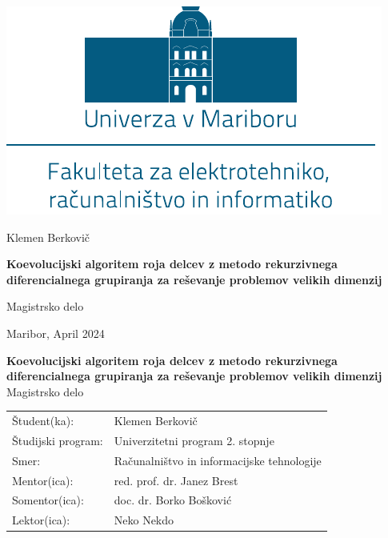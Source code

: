 \documentclass[openany, a4paper, 12pt]{book}
\newcounter{footnotemarknum}
\newcommand{\footnotemarkenv}{\addtocounter{footnotemarknum}{1}\footnotemark}
\newcommand{\aauthor}{Klemen Berkovi\v{c}}
\newcommand{\atitleslo}{Koevolucijski algoritem roja delcev z metodo rekurzivnega diferencialnega grupiranja za reševanje problemov velikih dimenzij}
\newcommand{\atype}{Magistrsko delo}
\newcommand{\adate}{Maribor, April 2024}
\newcommand{\amentor}{red. prof. dr. Janez Brest}
\newcommand{\asomentor}{doc. dr. Borko Bošković}
\newcommand{\alektor}{Neko Nekdo}
\begin{document}
\newpage
\begin{center}
\includegraphics[scale=0.9]{img/logo-um-feri.pdf} %
\vspace{3cm}

{\LARGE \aauthor\\} %
\vspace{10mm}

{\bf \huge \MakeUppercase \atitleslo}\\ %
\vspace{10mm}

{\LARGE \atype}\\ %
\vspace{8.5cm}

{\LARGE \adate}\\ %
\end{center}

\newpage
\pagestyle{frontpage}

\vspace*{7.5cm}
\begin{center}
{\bf \LARGE \MakeUppercase \atitleslo}\\ %
\vspace{5mm}
{\Large \atype}\\ %
\end{center}
\vspace{6cm}
\begin{table}[h]
    \renewcommand{\arraystretch}{1.5}
    \begin{tabular}{ll}
     Študent(ka): & \aauthor \\
     Študijski program: & Univerzitetni program 2. stopnje \\
     Smer: & Računalništvo in informacijske tehnologije \\
     Mentor(ica): & \amentor \\
     Somentor(ica): & \asomentor \\
     Lektor(ica): & \alektor \\
    \end{tabular}
\end{table}
\end{document}
